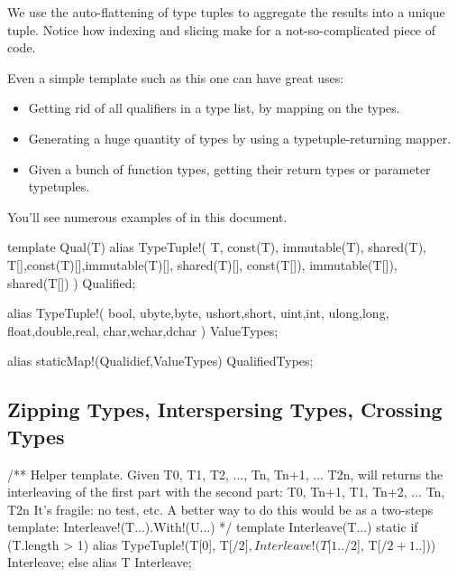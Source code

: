 
We use the auto-flattening of type tuples to aggregate the results into a unique tuple. Notice how indexing and slicing make for a not-so-complicated piece of code.

Even a simple template such as this one can have great uses:

\begin{itemize}
\item Getting rid of all qualifiers in a type list, by mapping  on the types.
\item Generating a huge quantity of types by using a typetuple-returning mapper.
\item Given a bunch of function types, getting their return types or parameter typetuples.
\end{itemize}

You'll see numerous examples of  in this document.

\begin{dcode}
template Qual(T)
{
    alias TypeTuple!(
                     T, const(T), immutable(T), shared(T),
                     T[],const(T)[],immutable(T)[], shared(T)[], 
                     const(T[]), immutable(T[]), shared(T[])
                    ) Qualified;
}

alias TypeTuple!(
                 bool,
                 ubyte,byte,
                 ushort,short,
                 uint,int,
                 ulong,long,
                 float,double,real,
                 char,wchar,dchar
                ) ValueTypes;

alias staticMap!(Qualidief,ValueTypes) QualifiedTypes;
\end{dcode}

\subsection{Zipping Types, Interspersing Types, Crossing Types}

\begin{dcode}
/**
Helper template. Given T0, T1, T2, ..., Tn, Tn+1, ... T2n, will returns
the interleaving of the first part with the second part: T0, Tn+1, T1, Tn+2, ... Tn, T2n
It's fragile: no test, etc. A better way to do this would be as a two-steps template: Interleave!(T...).With!(U...)
*/
template Interleave(T...)
{
    static if (T.length > 1)
        alias TypeTuple!(T[0], T[$/2], Interleave!(T[1..$/2], T[$/2+1 .. $])) Interleave;
    else
        alias T Interleave;
}
\end{dcode}

